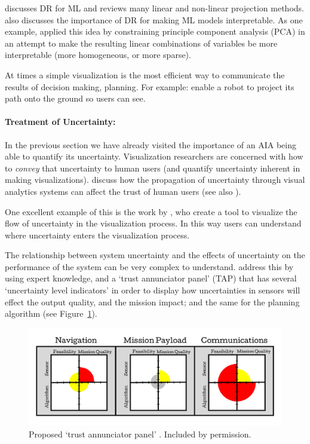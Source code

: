 \citet{Venna2007-yj} discusses DR for ML and reviews many linear and non-linear projection methods. \citet{Vellido2012-nm} also discusses the importance of DR for making ML models interpretable. As one example, \citet{Chipman2005-om} applied this idea by constraining principle component analysis (PCA) in an attempt to make the resulting linear combinations of variables be more interpretable (more homogeneous, or more sparse).

At times a simple visualization is the most efficient way to communicate the results of decision making, planning. For example: \citet{Chadalavada2015-wx} enable a robot to project its path onto the ground so users can see.

\paragraph{Treatment of Uncertainty:}
In the previous section we have already visited the importance of an AIA being able to quantify its uncertainty. Visualization researchers are concerned with how to \emph{convey} that uncertainty to human users (and quantify uncertainty inherent in making visualizations). \cite{Sacha2016-tu} discuss how the propagation of uncertainty through visual analytics systems can affect the trust of human users (see also \cite{Correa2009-hi}).

One excellent example of this is the work by \citet{Wu2012-qi}, who create a tool to visualize the flow of uncertainty in the visualization process. In this way users can understand where uncertainty enters the visualization process.

The relationship between system uncertainty and the effects of uncertainty on the performance of the system can be very complex to understand. \citet{Hutchins2015-if} address this by using expert knowledge, and a `trust annunciator panel' (TAP) that has several `uncertainty level indicators' in order to display how uncertainties in sensors will effect the output quality, and the mission impact; and the same for the planning algorithm (see Figure~\ref{fig:hutchins_fig}).

\begin{figure}[htpb]
    \centering
    \includegraphics[width=0.7\linewidth]{Figures/Hutchins_fig.pdf}
    \caption{Proposed `trust annunciator panel' \cite{Hutchins2015-if}. Included by permission.}
    \label{fig:hutchins_fig}
\end{figure}

